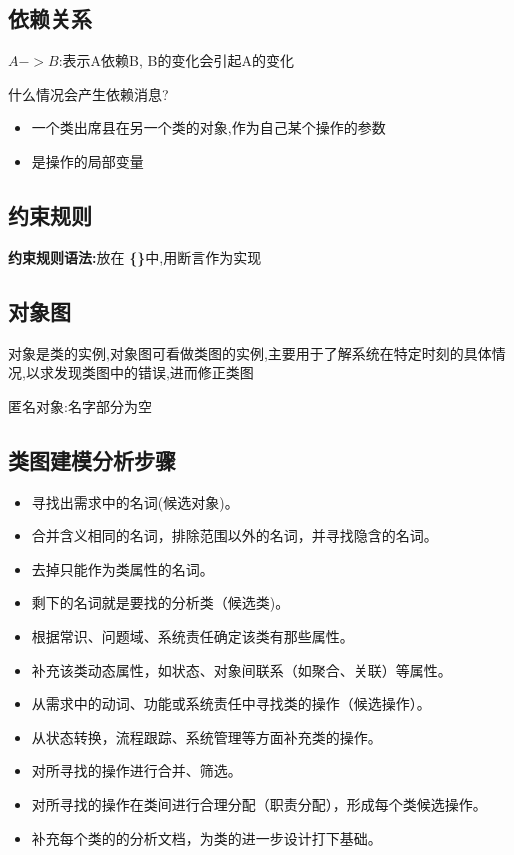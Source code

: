 \documentclass[UTF8,a4paper]{ctexart}
\begin{document}
\subsection{依赖关系}
$A-> B$:表示A依赖B, B的变化会引起A的变化

什么情况会产生依赖消息?
\begin{itemize}
  \item 一个类出席县在另一个类的对象,作为自己某个操作的参数
  \item 是操作的局部变量
\end{itemize}

\subsection{约束规则}
\textbf{约束规则语法:}放在 \textbf{\{\}}中,用断言作为实现


\subsection{对象图}
对象是类的实例,对象图可看做类图的实例,主要用于了解系统在特定时刻的具体情况,以求发现类图中的错误,进而修正类图

匿名对象:名字部分为空

\subsection{类图建模分析步骤}
\begin{itemize}
  \item 寻找出需求中的名词(候选对象)。
  \item 合并含义相同的名词，排除范围以外的名词，并寻找隐含的名词。
  \item 去掉只能作为类属性的名词。
  \item 剩下的名词就是要找的分析类（候选类)。
  \item 根据常识、问题域、系统责任确定该类有那些属性。
  \item 补充该类动态属性，如状态、对象间联系（如聚合、关联）等属性。
  \item 从需求中的动词、功能或系统责任中寻找类的操作（候选操作）。
  \item 从状态转换，流程跟踪、系统管理等方面补充类的操作。
  \item 对所寻找的操作进行合并、筛选。
  \item 对所寻找的操作在类间进行合理分配（职责分配），形成每个类候选操作。
  \item 补充每个类的的分析文档，为类的进一步设计打下基础。
\end{itemize}
\end{document}
